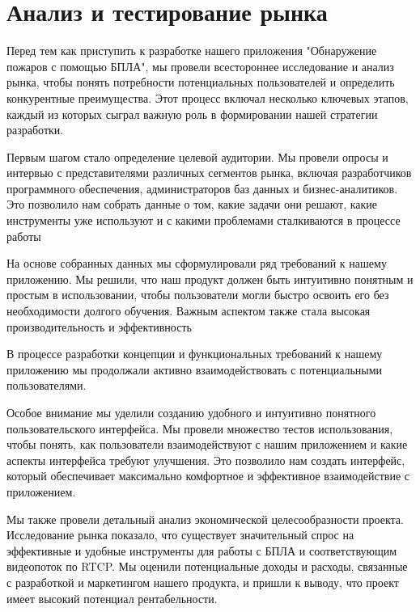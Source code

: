     \section{Анализ и тестирование рынка}
    Перед тем как приступить к разработке нашего приложения "Обнаружение пожаров с помощью БПЛА", мы провели всестороннее исследование и анализ рынка, чтобы понять потребности потенциальных пользователей и определить конкурентные преимущества. Этот процесс включал несколько ключевых этапов, каждый из которых сыграл важную роль в формировании нашей стратегии разработки.
    
    Первым шагом стало определение целевой аудитории. Мы провели опросы и интервью с представителями различных сегментов рынка, включая разработчиков программного обеспечения, администраторов баз данных и бизнес-аналитиков. Это позволило нам собрать данные о том, какие задачи они решают, какие инструменты уже используют и с какими проблемами сталкиваются в процессе работы
    
    На основе собранных данных мы сформулировали ряд требований к нашему приложению. Мы решили, что наш продукт должен быть интуитивно понятным и простым в использовании, чтобы пользователи могли быстро освоить его без необходимости долгого обучения. Важным аспектом также стала высокая производительность и эффективность
    
    В процессе разработки концепции и функциональных требований к нашему приложению мы продолжали активно взаимодействовать с потенциальными пользователями. 
    
    Особое внимание мы уделили созданию удобного и интуитивно понятного пользовательского интерфейса. Мы провели множество тестов использования, чтобы понять, как пользователи взаимодействуют с нашим приложением и какие аспекты интерфейса требуют улучшения. Это позволило нам создать интерфейс, который обеспечивает максимально комфортное и эффективное взаимодействие с приложением.
    
    Мы также провели детальный анализ экономической целесообразности проекта. Исследование рынка показало, что существует значительный спрос на эффективные и удобные инструменты для работы с БПЛА и соответствующим видеопоток по RTCP. Мы оценили потенциальные доходы и расходы, связанные с разработкой и маркетингом нашего продукта, и пришли к выводу, что проект имеет высокий потенциал рентабельности.
    
